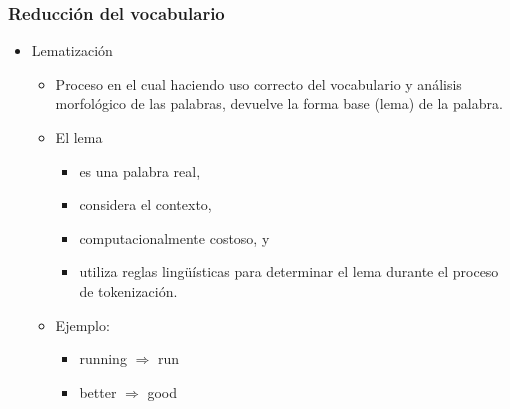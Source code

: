 \documentclass[
10pt, %
aspectratio=169, %
]{beamer}
\begin{document}
	\begin{frame}
		
		\frametitle{Reducción del vocabulario}
		
		\begin{itemize}
			\item Lematización
			
			\begin{itemize}
				\item Proceso en el cual haciendo uso correcto del vocabulario y análisis morfológico de las palabras, devuelve la forma base (lema) de la palabra.
				
				\item El lema 
				\begin{itemize}
					\item es una palabra real,
					
					\item considera el contexto, 
					
					\item computacionalmente costoso, y
					
					\item utiliza reglas lingüísticas para determinar el lema durante el proceso de tokenización.
					
				\end{itemize}
				
				\pause
				\item Ejemplo: 
				\begin{itemize}
					\item running $\Rightarrow$ run
					\item better $\Rightarrow$ good
				\end{itemize}
				
			\end{itemize}
		
		\end{itemize}
		
	\end{frame}
	
	
\end{document}
